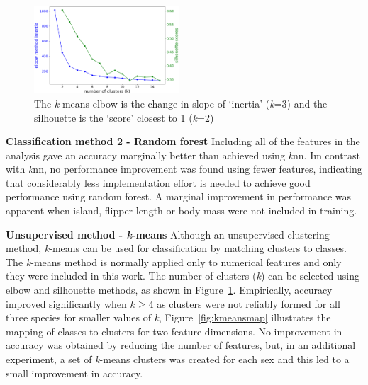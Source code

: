 \documentclass[12pt]{article}
\begin{document}
\begin{figure} %
  \centering
  \vspace{-2\baselineskip} %
  \includegraphics[width=0.48\textwidth]{kmeansvalue.png} %
  \vspace{-1.5\baselineskip} %
  \caption{\centering\linespread{0.8}\selectfont The \textit{k}-means elbow is the change in slope of `inertia' (\textit{k}=3)
  and the silhouette is the `score' closest to 1 (\textit{k}=2)}
  \vspace{-0.5\baselineskip} %
  \label{fig:kmeansvalue}
\end{figure}

\textbf{Classification method 2 - Random forest}  
Including all of the features in the analysis gave an accuracy marginally better 
than achieved using \textit{k}nn. 
Im contrast with \textit{k}nn, no performance improvement was found using fewer features, indicating that 
considerably less implementation effort is needed to achieve good performance using random forest. 
A marginal improvement in performance was apparent when island, flipper length or body mass were not included in training.

\textbf{Unsupervised method - \textit{k}-means}  
Although an unsupervised clustering method, 
\textit{k}-means can be used for classification by matching clusters to classes. 
The \textit{k}-means method is normally applied only to numerical features and only they were included in this work. 
The number of clusters (\textit{k}) can be selected using elbow and silhouette methods, 
as shown in Figure~\ref{fig:kmeansvalue}. Empirically, accuracy improved significantly when \(k \geq 4\)
as clusters were not reliably formed for all three species for smaller values of \textit{k},  
Figure~\ref{fig:kmeansmap} illustrates the mapping of classes to clusters for two feature dimensions. 
No improvement in accuracy was obtained by reducing the number of features, 
but, in an additional experiment, a set of \textit{k}-means clusters was created for each sex 
and this led to a small improvement in accuracy. 
\end{document}

